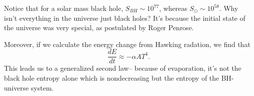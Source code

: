 Notice that for a solar mass black hole, $S_{BH}\sim 10^{77}$, whereas $S_{\odot} \sim 10^{58}$. Why isn't everything in the universe just black holes? It's because the initial state of the universe was very special, as postulated by Roger Penrose.

Moreover, if we calculate the energy change from Hawking radation, we find that
\begin{equation}
    \frac{dE}{dt} \approx -\alpha A T^4.
\end{equation}
This leads us to a generalized second law-- because of evaporation, it's not the black hole entropy alone which is nondecreasing but the entropy of the BH-universe system.
